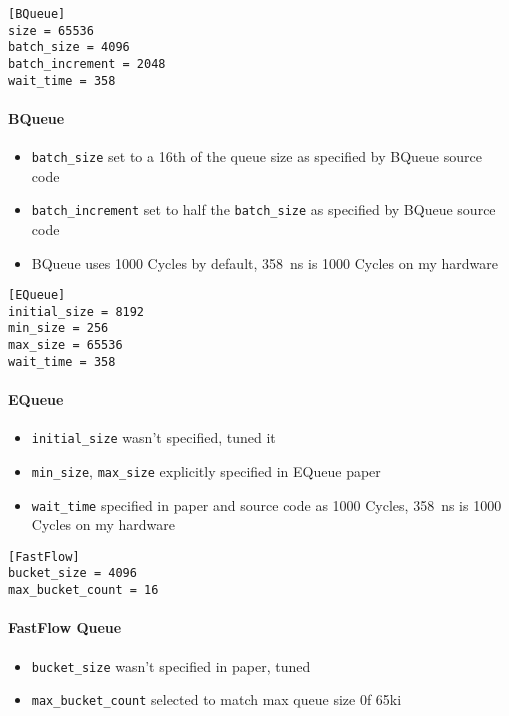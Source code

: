 \begin{verbatim}
[BQueue]
size = 65536
batch_size = 4096
batch_increment = 2048
wait_time = 358
\end{verbatim}
\paragraph{BQueue}
\begin{itemize}
    \item \texttt{batch\_size} set to a 16th of the queue size as specified by BQueue source code
    \item \texttt{batch\_increment} set to half the \texttt{batch\_size} as specified by BQueue source code
    \item BQueue uses 1000 Cycles by default, \SI{358}{\nano\second} is 1000 Cycles on my hardware
\end{itemize}

\begin{verbatim}
[EQueue]
initial_size = 8192
min_size = 256
max_size = 65536
wait_time = 358
\end{verbatim}
\paragraph{EQueue}
\begin{itemize}
    \item \texttt{initial\_size} wasn't specified, tuned it
    \item \texttt{min\_size}, \texttt{max\_size} explicitly specified in EQueue paper
    \item \texttt{wait\_time} specified in paper and source code as 1000 Cycles, \SI{358}{\nano\second} is
        1000 Cycles on my hardware
\end{itemize}

\begin{verbatim}
[FastFlow]
bucket_size = 4096
max_bucket_count = 16
\end{verbatim}
\paragraph{FastFlow Queue}
\begin{itemize}
    \item \texttt{bucket\_size} wasn't specified in paper, tuned
    \item \texttt{max\_bucket\_count} selected to match max queue size 0f 65ki
\end{itemize}

